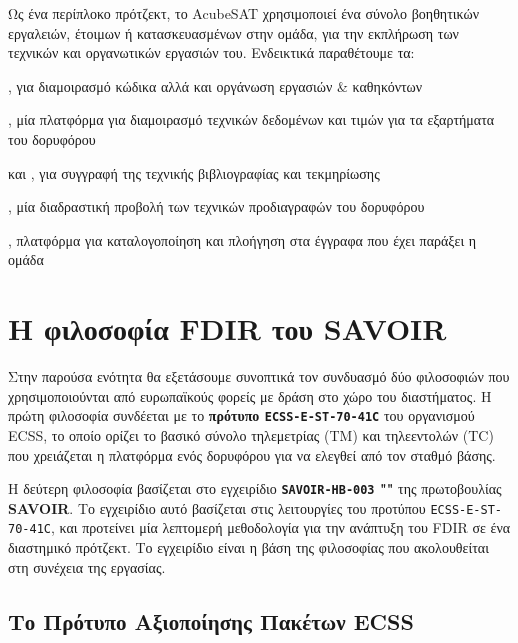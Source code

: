 \documentclass[a4paper,nobib]{tufte-book}
\begin{document}
Ως ένα περίπλοκο πρότζεκτ, το AcubeSAT χρησιμοποιεί ένα σύνολο βοηθητικών εργαλειών, έτοιμων ή κατασκευασμένων στην ομάδα, για την εκπλήρωση των τεχνικών και οργανωτικών εργασιών του. Ενδεικτικά παραθέτουμε τα:
\begin{compactitem}
	\item {}, για διαμοιρασμό κώδικα αλλά και οργάνωση εργασιών \& καθηκόντων
	\item {}, μία πλατφόρμα για διαμοιρασμό τεχνικών δεδομένων και τιμών για τα εξαρτήματα του δορυφόρου
	\item  {} και , για συγγραφή της τεχνικής βιβλιογραφίας και τεκμηρίωσης
	\item {}, μία διαδραστική προβολή των τεχνικών προδιαγραφών του δορυφόρου
	\item {}, πλατφόρμα για καταλογοποίηση και πλοήγηση στα έγγραφα που έχει παράξει η ομάδα
\end{compactitem}

\chapter{Η φιλοσοφία \ac{FDIR} του SAVOIR}
\label{cap:savoir}

Στην παρούσα ενότητα θα εξετάσουμε συνοπτικά τον συνδυασμό δύο φιλοσοφιών που χρησιμοποιούνται από ευρωπαϊκούς φορείς με δράση στο χώρο του διαστήματος. Η πρώτη φιλοσοφία συνδέεται με το \textbf{πρότυπο \texttt{ECSS-E-ST-70-41C}} \autocite{ECSS-E-ST-70-41C} του οργανισμού \acf{ECSS}, το οποίο ορίζει το βασικό σύνολο τηλεμετρίας (\acs{TM}) και τηλεεντολών (\acs{TC}) που χρειάζεται η πλατφόρμα ενός δορυφόρου για να ελεγθεί από τον σταθμό βάσης.

Η δεύτερη φιλοσοφία βασίζεται στο εγχειρίδιο \textbf{\texttt{SAVOIR-HB-003} ""} \autocite{SAVOIR-HB-003} της πρωτοβουλίας \textbf{\acf{SAVOIR}}. Το εγχειρίδιο αυτό βασίζεται στις λειτουργίες του προτύπου \texttt{ECSS-E-ST-70-41C}, και προτείνει μία λεπτομερή μεθοδολογία για την ανάπτυξη του \ac{FDIR} σε ένα διαστημικό πρότζεκτ. Το εγχειρίδιο είναι η βάση της φιλοσοφίας που ακολουθείται στη συνέχεια της εργασίας.

\section{Το Πρότυπο Αξιοποίησης Πακέτων \acs{ECSS}}
\label{sec:pus}
\end{document}
